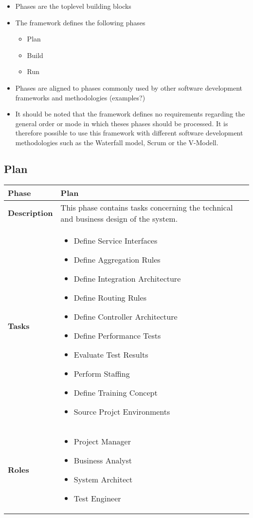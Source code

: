 \begin{itemize}
	\item Phases are the toplevel building blocks
	\item The framework defines the following phases
	\begin{itemize}
		\item Plan
		\item Build
		\item Run
	\end{itemize}
	\item Phases are aligned to phases commonly used by other software development frameworks and methodologies (examples?)
	\item It should be noted that the framework defines no requirements regarding the general order or mode in which theses phases should be processed. It is therefore possible to use this framework with different software development methodologies such as the Waterfall model, Scrum or the V-Modell.
\end{itemize}

\subsection{Plan}
	\begin{tabularx}{\textwidth}{@{} l X @{}}
		\caption{Phase: Plan}\label{table:ch6_View_Plan}\\
		\toprule
		\bfseries Phase & Plan\\
		\midrule 
		\bfseries Description & This phase contains tasks concerning the technical and business design of the system.\\
		\midrule
		\bfseries Tasks & \begin{itemize}
			\item Define Service Interfaces
			\item Define Aggregation Rules
			\item Define Integration Architecture
			\item Define Routing Rules
			\item Define Controller Architecture
			\item Define Performance Tests
			\item Evaluate Test Results
			\item Perform Staffing
			\item Define Training Concept
			\item Source Projct Environments
		\end{itemize}\\
		\midrule
		\bfseries Roles & \begin{itemize}
			\item Project Manager
			\item Business Analyst
			\item System Architect
			\item Test Engineer
		\end{itemize}\\
		\bottomrule
	\end{tabularx}
	
